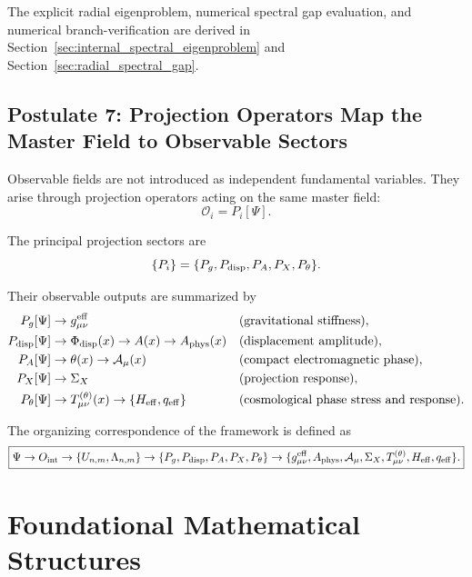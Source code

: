 \documentclass[11pt]{article}
\begin{document}
The explicit radial eigenproblem, numerical spectral gap evaluation, and numerical branch-verification are derived in Section~\ref{sec:internal_spectral_eigenproblem} and Section~\ref{sec:radial_spectral_gap}.

\subsection{Postulate 7: Projection Operators Map the Master Field to Observable Sectors}
\label{sec:postulate_projection_operators_observable_sectors}

Observable fields are not introduced as independent fundamental variables. They arise through projection operators \cite{vonneumann1932, GelfandNaimark1943, Segal1947} acting on the same master field:
\begin{equation}
\mathcal O_i=P_i[\Psi].
\end{equation}

The principal projection sectors are
\begin{equation}
\{P_i\}
=
\{P_g,P_{\rm disp},P_A,P_X,P_\theta\}.
\end{equation}

Their observable outputs are summarized by
\begin{align}
P_g[\Psi]
&\rightarrow
g_{\mu\nu}^{\rm eff}
&&
\text{(gravitational stiffness)},\\
P_{\rm disp}[\Psi]
&\rightarrow
\Phi_{\rm disp}(x)
\rightarrow
A(x)
\rightarrow
A_{\rm phys}(x)
&&
\text{(displacement amplitude)},\\
P_A[\Psi]
&\rightarrow
\theta(x)
\rightarrow
\mathcal A_\mu(x)
&&
\text{(compact electromagnetic phase)},\\
P_X[\Psi]
&\rightarrow
\Sigma_X
&&
\text{(projection response)},\\
P_\theta[\Psi]
&\rightarrow
T_{\mu\nu}^{(\theta)}(x)
\rightarrow
\{H_{\rm eff},q_{\rm eff}\}
&&
\text{(cosmological phase stress and response)}.
\end{align}

The organizing correspondence of the framework is defined as
\begin{equation}
\boxed{
\Psi
\rightarrow
O_{\rm int}
\rightarrow
\{U_{n,m},\Lambda_{n,m}\}
\rightarrow
\{P_g,P_{\rm disp},P_A,P_X,P_\theta\}
\rightarrow
\{g_{\mu\nu}^{\rm eff},A_{\rm phys},\mathcal A_\mu,\Sigma_X,
T_{\mu\nu}^{(\theta)},H_{\rm eff},q_{\rm eff}\}.
}
\end{equation}

\section{Foundational Mathematical Structures}
\label{sec:foundational_mathematical_structures}
\end{document}

